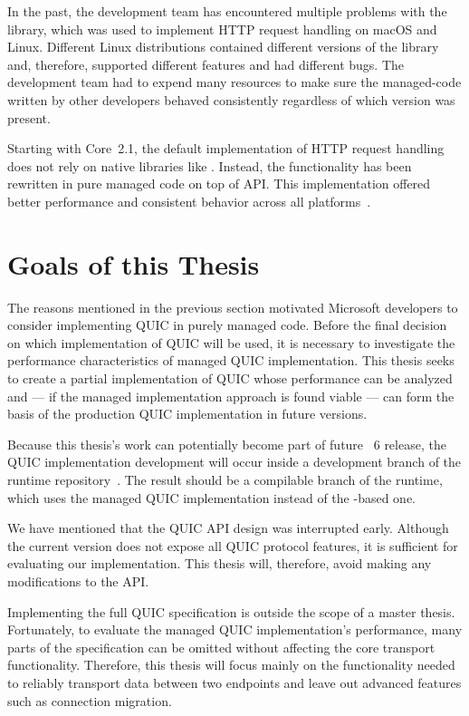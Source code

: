 In the past, the \dotnet{} development team has encountered multiple problems with the
\libcurl{}~\cite{curlGithub} library, which was used to implement HTTP request handling on macOS and
Linux. Different Linux distributions contained different versions of the \libcurl{} library and,
therefore, supported different features and had different bugs. The \dotnet{} development team had
to expend many resources to make sure the \gls{managed-code} written by other \dotnet{} developers
behaved consistently regardless of which \libcurl{} version was present.

Starting with \dotnet{} Core~2.1, the default implementation of HTTP request handling does not rely
on native libraries like \libcurl{}. Instead, the functionality has been rewritten in pure managed
code on top of \Socket{} API\@. This implementation offered better performance and consistent
behavior across all \dotnet{} platforms~\cite{SocketsHttpHandlerDocs}.

\section{Goals of this Thesis}\label{sec:01-goals}

The reasons mentioned in the previous section motivated Microsoft developers to consider
implementing QUIC in purely managed \csharp{} code. Before the final decision on which
implementation of QUIC will be used, it is necessary to investigate the performance characteristics
of managed QUIC implementation. This thesis seeks to create a partial implementation of QUIC whose
performance can be analyzed and --- if the managed implementation approach is found viable --- can form
the basis of the production QUIC implementation in future \dotnet{} versions.

Because this thesis's work can potentially become part of future \dotnet{}~6 release, the QUIC
implementation development will occur inside a development branch of the \dotnet{} runtime
repository~\cite{dotnetGithub}. The result should be a compilable branch of the runtime, which uses
the managed QUIC implementation instead of the \libmsquic{}-based one.

We have mentioned that the \dotnet{} QUIC API design was interrupted early. Although the current
version does not expose all QUIC protocol features, it is sufficient for evaluating our
implementation. This thesis will, therefore, avoid making any modifications to the API\@.

Implementing the full QUIC specification is outside the scope of a master thesis. Fortunately, to
evaluate the managed QUIC implementation's performance, many parts of the specification can be
omitted without affecting the core transport functionality. Therefore, this thesis will focus mainly
on the functionality needed to reliably transport data between two endpoints and leave out advanced
features such as connection migration.

